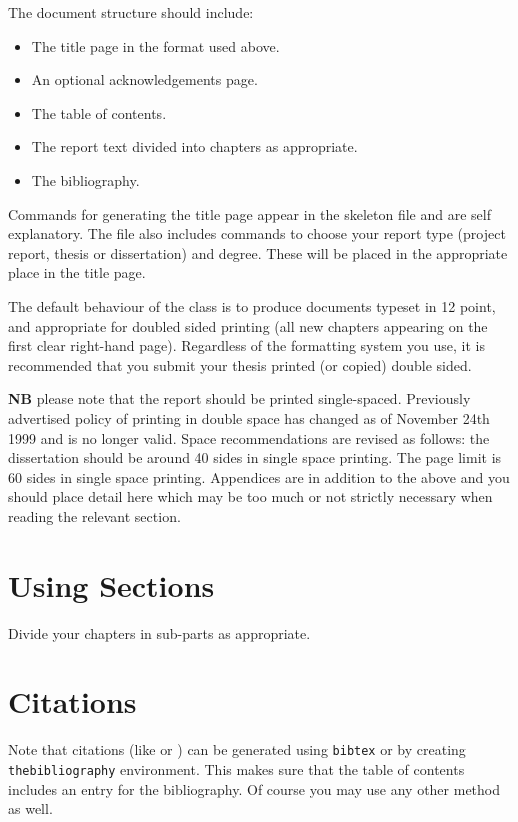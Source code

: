 \documentclass[parskip]{cs4rep}
\begin{document}
The document structure should include:
\begin{itemize}
\item
The title page  in the format used above.
\item
An optional acknowledgements page.
\item
The table of contents.
\item
The report text divided into chapters as appropriate.
\item
The bibliography.
\end{itemize}

Commands for generating the title page appear in the skeleton file and
are self explanatory.
The file also includes commands to choose your report type (project
report, thesis or dissertation) and degree.
These will be placed in the appropriate place in the title page. 

The default behaviour of the class is to produce documents typeset in
12 point, 
and appropriate for doubled sided printing
(all new chapters appearing on the first clear right-hand page).
Regardless of the formatting system you use, 
it is recommended that you submit your thesis printed (or copied) 
double sided. 

{\bf NB} please note that the report should be printed single-spaced.
Previously advertised policy of printing in double space has changed
as of November 24th 1999 and is no longer valid.
Space recommendations are revised as follows: 
the dissertation should be around 40 sides in single space printing.
The page limit is 60 sides in single space printing.  Appendices are in
addition to the above and you should place detail here which may be too
much or not strictly necessary when reading the relevant section.

\section{Using Sections}

Divide your chapters in sub-parts as appropriate.

\section{Citations}

Note that citations 
(like \cite{P1} or \cite{P2})
can be generated using {\tt bibtex} or by
creating {\tt thebibliography} environment. This makes sure that the
table of contents includes an entry for the bibliography.
Of course you may use any other method as well.
\end{document}
